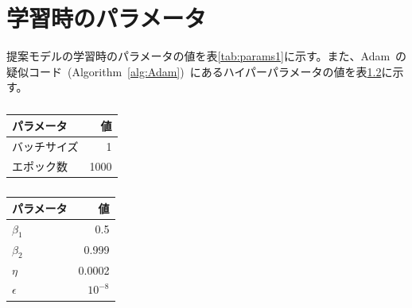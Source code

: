 \appendix
\chapter{学習時のパラメータ}
\label{sec:appendix_params}

提案モデルの学習時のパラメータの値を表\ref{tab:params1}に示す。また、Adam~\cite{Adam}の疑似コード~(Algorithm~\ref{alg:Adam})~にあるハイパーパラメータの値を表\ref{tab:params2}に示す。

\begin{table}[b]
\begin{center}
\begin{minipage}{0.49\hsize}
    \begin{center}
        \begin{tabular}{lr}\toprule
            パラメータ & 値 \\ \midrule
            バッチサイズ & 1 \\ 
            エポック数 & 1000 \\ \bottomrule
        \end{tabular}
    \end{center}
    \caption{}
    \label{tab:params1}
\end{minipage}
\begin{minipage}{0.49\hsize}
    \begin{center}
        \begin{tabular}{lr}\toprule
            パラメータ & 値 \\ \midrule
            $\beta_1$ & 0.5 \\
            $\beta_2$ & 0.999 \\
            $\eta$ & 0.0002 \\ 
            $\epsilon$ & $10^{-8}$ \\ \bottomrule
        \end{tabular}
    \end{center}
    \caption{}
    \label{tab:params2}
\end{minipage}
\end{center}
\end{table}

